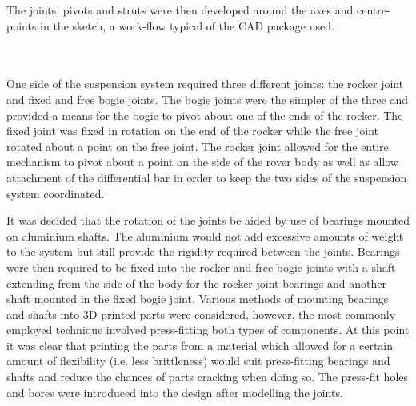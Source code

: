       The joints, pivots and struts were then developed around the axes and centre-points in the sketch, a work-flow typical of the CAD package used.
      
      \\\\
        One side of the suspension system required three different joints: the rocker joint and fixed and free bogie joints. The bogie joints were the simpler of the three and provided a means for the bogie to pivot about one of the ends of the rocker. The fixed joint was fixed in rotation on the end of the rocker while the free joint rotated about a point on the free joint. The rocker joint allowed for the entire mechanism to pivot about a point on the side of the rover body as well as allow attachment of the differential bar in order to keep the two sides of the suspension system coordinated.
        
        It was decided that the rotation of the joints be aided by use of bearings mounted on aluminium shafts. The aluminium would not add excessive amounts of weight to the system but still provide the rigidity required between the joints. Bearings were then required to be fixed into the rocker and free bogie joints with a shaft extending from the side of the body for the rocker joint bearings and another shaft mounted in the fixed bogie joint. Various methods of mounting bearings and shafts into 3D printed parts were considered, however, the most commonly employed technique involved press-fitting both types of components. At this point it was clear that printing the parts from a material which allowed for a certain amount of flexibility (i.e. less brittleness) would suit press-fitting bearings and shafts and reduce the chances of parts cracking when doing so. The press-fit holes and bores were introduced into the design after modelling the joints.
        
